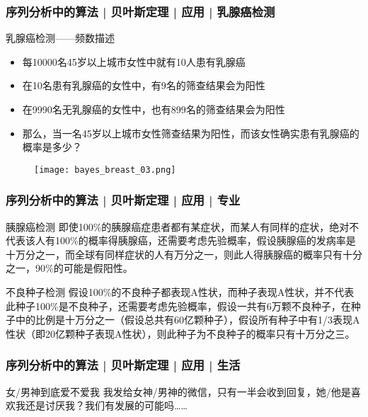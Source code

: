 \begin{frame}
  \frametitle{序列分析中的算法 | 贝叶斯定理 | 应用 | 乳腺癌检测}
  \begin{block}{乳腺癌检测——频数描述}
    \begin{itemize}
      \item 每10000名45岁以上城市女性中就有10人患有乳腺癌
      \item 在10名患有乳腺癌的女性中，有9名的筛查结果会为阳性
      \item 在9990名无乳腺癌的女性中，也有899名的筛查结果会为阳性
      \item 那么，当一名45岁以上城市女性筛查结果为阳性，而该女性确实患有乳腺癌的概率是多少？
    \end{itemize}
  \end{block}
  \begin{figure}
    \centering
    \texttt{[image: bayes\_breast\_03.png]}
  \end{figure}
\end{frame}

\begin{frame}
  \frametitle{序列分析中的算法 | 贝叶斯定理 | 应用 | 专业}
  \begin{block}{胰腺癌检测}
即使100\%的胰腺癌症患者都有某症状，而某人有同样的症状，绝对不代表该人有100\%的概率得胰腺癌，还需要考虑先验概率，假设胰腺癌的发病率是十万分之一，而全球有同样症状的人有万分之一，则此人得胰腺癌的概率只有十分之一，90\%的可能是假阳性。
  \end{block}
  \pause
  \begin{block}{不良种子检测}
假设100\%的不良种子都表现A性状，而种子表现A性状，并不代表此种子100\%是不良种子，还需要考虑先验概率，假设一共有6万颗不良种子，在种子中的比例是十万分之一（假设总共有60亿颗种子），假设所有种子中有1/3表现A性状（即20亿颗种子表现A性状），则此种子为不良种子的概率只有十万分之三。
  \end{block}
\end{frame}

\begin{frame}
  \frametitle{序列分析中的算法 | 贝叶斯定理 | 应用 | 生活}
  \begin{block}{女/男神到底爱不爱我}
    我发给女神/男神的微信，只有一半会收到回复，她/他是喜欢我还是讨厌我？我们有发展的可能吗……
  \end{block}
  \begin{figure}
    \centering
  \end{figure}
\end{frame}

